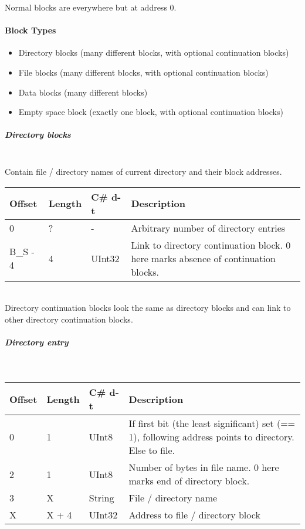 \documentclass[a4paper,12pt]{article}
\begin{document}
Normal blocks are everywhere but at address 0.

\paragraph{Block Types}

\begin{itemize}
	\item Directory blocks (many different blocks, with optional continuation blocks)
	\item File blocks (many different blocks, with optional continuation blocks)
	\item Data blocks (many different blocks)
	\item Empty space block (exactly one block, with optional continuation blocks)
\end{itemize}

\subparagraph{Directory blocks} \mbox{} \\

Contain file / directory names of current directory and their block addresses.\\

\begin{tabular}{|p{1.5cm}|p{1.5cm}|p{1.5cm}|p{7cm}|}\hline
Offset 	&Length	&C\# d-t	&Description\\\hline
0	&?	&-	&Arbitrary number of directory entries\\
B\_S - 4	&4	&UInt32	&Link to directory continuation block. 0 here marks absence of continuation blocks.\\\hline
\end{tabular} \\

Directory continuation blocks look the same as directory blocks and can link to other directory continuation blocks.

\subparagraph{Directory entry} \mbox{} \\

\begin{tabular}{|p{1.5cm}|p{1.5cm}|p{1.5cm}|p{7cm}|}\hline
Offset 	&Length	&C\# d-t	&Description\\\hline
0	&1	&UInt8	&If first bit (the least significant) set (== 1), following address points to directory. Else to file.\\
2	&1	&UInt8	&Number of bytes in file name. 0 here marks end of directory block.\\
3	&X	&String	&File / directory name\\
X	&X + 4	&UInt32	&Address to file / directory block\\\hline
\end{tabular} \\
\end{document}
